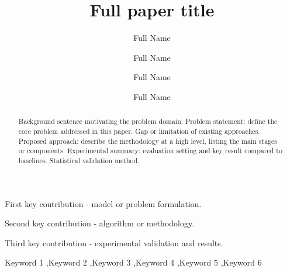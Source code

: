 \documentclass[a4paper,fleqn]{cas-dc}
\begin{document}
\let\WriteBookmarks\relax
\def\floatpagepagefraction{1}
\def\textpagefraction{.001}


\title[mode=title]{Full paper title}

\author[1]{Full Name}%
\fnmark[1]


\author[2]{Full Name}%
\cormark[1]
\fnmark[2]


\author[1]{Full Name}%
\fnmark[1]

\author[1]{Full Name}%
\fnmark[1]


\begin{abstract}
Background sentence motivating the problem domain.
Problem statement: define the core problem addressed in this paper.
Gap or limitation of existing approaches.
Proposed approach: describe the methodology at a high level, listing the main stages or components.
Experimental summary: evaluation setting and key result compared to baselines.
Statistical validation method.
\end{abstract}

\begin{highlights}
\item First key contribution - model or problem formulation.
\item Second key contribution - algorithm or methodology.
\item Third key contribution - experimental validation and results.
\end{highlights}

\begin{keywords}
Keyword 1 \sep Keyword 2 \sep Keyword 3 \sep Keyword 4 \sep Keyword 5 \sep Keyword 6
\end{keywords}
\end{document}

